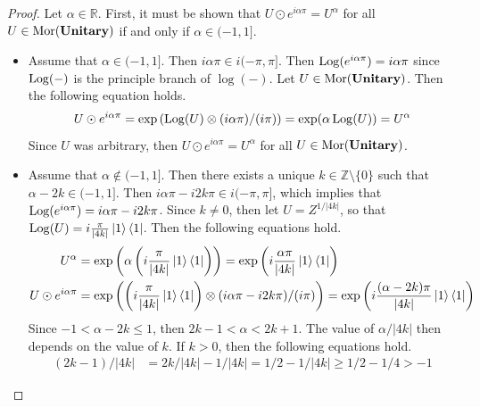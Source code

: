 \begin{proof}
    Let $\alpha \in \mathbb{R}$.
    First, it must be shown that $U \odot e^{i\alpha\pi} = U^\alpha$ for all $U \in \operatorname{Mor}( \mathbf{Unitary} )$ if and only if $\alpha \in (-1, 1]$.
    \begin{itemize}
    \item Assume that $\alpha \in ( -1, 1 ]$.
          Then $i\alpha\pi \in i( -\pi, \pi ]$.
          Then $\operatorname{Log}( e^{i\alpha\pi} ) = i\alpha\pi$ since $\operatorname{Log}( - )$ is the principle branch of $\log( - )$.
          Let $U \in \operatorname{Mor}( \mathbf{Unitary} )$.
          Then the following equation holds.
          \begin{equation*}
              U \odot e^{i\alpha\pi}
              =
              \exp\left( \operatorname{Log}( U ) \otimes ( i\alpha\pi ) / (i\pi) \right)
              =
              \exp( \alpha \operatorname{Log}( U ) )
              =
              U^\alpha
          \end{equation*}
          Since $U$ was arbitrary, then $U \odot e^{i\alpha\pi} = U^\alpha$ for all $U \in \operatorname{Mor}( \mathbf{Unitary} )$.
    \item Assume that $\alpha \not \in ( -1, 1 ]$.
          Then there exists a unique $k \in \mathbb{Z} \setminus \{ 0 \}$ such that $\alpha - 2k \in ( -1, 1 ]$.
          Then $i\alpha\pi - i2k\pi \in i( -\pi, \pi ]$, which implies that $\operatorname{Log}( e^{i\alpha\pi} ) = i\alpha\pi - i2k\pi$.
          Since $k \ne 0$, then let $U = Z^{1/|4k|}$, so that $\operatorname{Log}( U ) = i \frac{\pi}{|4k|} \ket{1} \bra{1}$.
          Then the following equations hold.
          \begin{align*}
              U^\alpha
              &=
              \exp\left( \alpha \left( i\frac{\pi}{|4k|} \ket{1} \bra{1} \right) \right)
              =
              \exp\left( i \frac{\alpha\pi}{|4k|} \ket{1} \bra{1} \right)
              \\
              U \odot e^{i\alpha\pi}
              &=
              \exp\left( \left( i\frac{\pi}{|4k|} \ket{1} \bra{1} \right) \otimes ( i\alpha\pi - i2k\pi ) / (i\pi) \right)
              =
              \exp\left( i \frac{(\alpha-2k)\pi}{|4k|} \ket{1} \bra{1} \right)
          \end{align*}
          Since $-1 < \alpha - 2k \le 1$, then $2k - 1 < \alpha < 2k + 1$.
          The value of $\alpha / |4k|$ then depends on the value of $k$.
          If $k > 0$, then the following equations hold.
          \begin{align*}
              (2k - 1)/|4k| &= 2k/|4k| - 1/|4k| = 1/2 - 1/|4k| \ge 1/2 - 1/4 > -1

\end{align*}
\end{itemize}
\end{proof}
